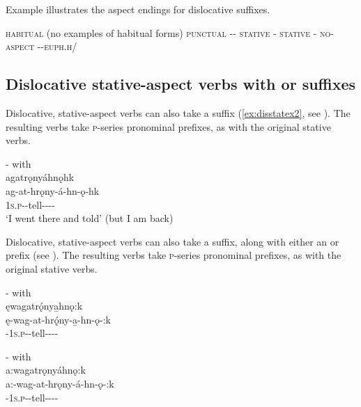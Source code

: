 Example  illustrates the aspect endings for dislocative suffixes.

\ea\label{ex:dislocendex6} 
\ea \textsc{habitual} (no examples of habitual forms)
\ex \textsc{punctual}  {\dislocative}-{\joinerA}-{\punctual}
\ex \textsc{stative}  {\dislocative}-{\stative}
\ex \textsc{stative}  {\dislocative}-{\stative}
\ex \textsc{no-aspect}  {\dislocative}-{\joinerA}-\textsc{euph.h}/{\noaspect}
\z
\z


\subsection{Dislocative stative-aspect verbs with  {\former} or  {\modalizer} suffixes} \label{{Dislocative with [-ǫh, -ǫ:] stative suffixes}}
Dislocative, stative-aspect verbs can also take a  {\former} suffix (\ref{ex:disstatex2}, see ). The resulting verbs take \textsc{p}-series pronominal prefixes, as with the original stative verbs.


\ea\label{ex:disstatex2}  {\dislocative}-{\stative} with {\former}\\
agatrǫnyáhnǫhk\\
\gll ag-at-hrǫny-á-hn-ǫ-hk\\
\textsc{1s.p}-{\semireflexive}-tell-{\joinerA}-{\dislocative}-{\stative}-{\former}\\
\glt ‘I went there and told’ (but I am back)
\z


Dislocative, stative-aspect verbs can also take a  {\modalizer} suffix, along with either an  {\future} or  \textsc{\indefinite} prefix  (see ). The resulting verbs take \textsc{p}-series pronominal prefixes, as with the original stative verbs.

\ea\label{ex:disstatex3}  {\dislocative}-{\stative} with {\modalizer}\\
ęwagatrǫ́nya̱hnǫ:k\\
\gll ę-wag-at-hrǫ́ny-a̱-hn-ǫ-:k\\
\fut-\textsc{1s.p}-{\semireflexive}-tell-{\joinerA}-{\dislocative}-{\stative}-{\modalizer}\\
\z


\ea\label{ex:disstatex4}  {\dislocative}-{\stative} with {\modalizer}\\
a:wagatrǫnyáhnǫ:k\\
\gll a:-wag-at-hrǫny-á-hn-ǫ-:k\\
{\indefinite}-\textsc{1s.p}-{\semireflexive}-tell-{\joinerA}-{\dislocative}-{\stative}-{\modalizer}\\
\z


